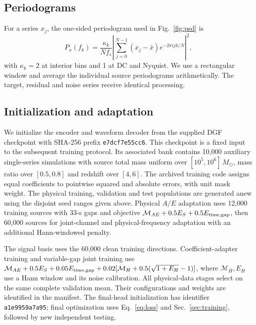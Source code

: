 \documentclass[10pt,prd,aps,a4paper,twocolumn,superscriptaddress,nofootinbib,floatfix]{revtex4-2}
\begin{document}
\subsection{Periodograms}
For a series $x_j$, the one-sided periodogram used in Fig.~\ref{fig:psd} is
\begin{equation}
P_x(f_k)=\frac{\kappa_k}{Nf_s}\left|\sum_{j=0}^{N-1}(x_j-\bar x)e^{-2\pi i jk/N}\right|^2,
\end{equation}
with $\kappa_k=2$ at interior bins and 1 at DC and Nyquist. We use a rectangular window and average the individual source periodograms arithmetically. The target, residual and noise series receive identical processing.

\subsection{Initialization and adaptation}\label{app:initialization}
We initialize the encoder and waveform decoder from the supplied DGF checkpoint with SHA-256 prefix \texttt{e7dcf7e55cc6}. This checkpoint is a fixed input to the subsequent training protocol. Its associated bank contains 10,000 auxiliary single-series simulations with source total mass uniform over $[10^5,10^6]\,M_\odot$, mass ratio over $[0.5,0.8]$ and redshift over $[4,6]$. The archived training code assigns equal coefficients to pointwise squared and absolute errors, with unit mask weight. The physical training, validation and test populations are generated anew using the disjoint seed ranges given above. Physical $A/E$ adaptation uses 12,000 training sources with 33-s gaps and objective $\mathcal M_{AE}+0.5E_S+0.5E_{\rm time,gap}$, then 60,000 sources for joint-channel and physical-frequency adaptation with an additional Hann-windowed penalty.

The signal basis uses the 60,000 clean training directions. Coefficient-adapter training and variable-gap joint training use $\mathcal M_{AE}+0.5E_S+0.05E_{\rm time,gap}+0.02[\mathcal M_H+0.5(\sqrt{1+E_H}-1)]$, where $\mathcal M_H,E_H$ use a Hann window and its noise calibration. All physical-data stages select on the same complete validation mean. Their configurations and weights are identified in the manifest. The final-head initialization has identifier \texttt{a1e9959a7a95}; final optimization uses Eq.~\eqref{eq:loss} and Sec.~\ref{sec:training}, followed by new independent testing.
\end{document}
